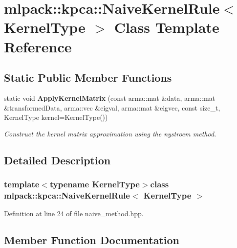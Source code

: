 \section{mlpack\-:\-:kpca\-:\-:Naive\-Kernel\-Rule$<$ Kernel\-Type $>$ Class Template Reference}
\label{classmlpack_1_1kpca_1_1NaiveKernelRule}
\subsection*{Static Public Member Functions}
\begin{DoxyCompactItemize}
\item 
static void {\bf Apply\-Kernel\-Matrix} (const arma\-::mat \&data, arma\-::mat \&transformed\-Data, arma\-::vec \&eigval, arma\-::mat \&eigvec, const size\-\_\-t, Kernel\-Type kernel=Kernel\-Type())
\begin{DoxyCompactList}\small\item\em Construct the kernel matrix approximation using the nystroem method. \end{DoxyCompactList}\end{DoxyCompactItemize}


\subsection{Detailed Description}
\subsubsection*{template$<$typename Kernel\-Type$>$class mlpack\-::kpca\-::\-Naive\-Kernel\-Rule$<$ Kernel\-Type $>$}



Definition at line 24 of file naive\-\_\-method.\-hpp.



\subsection{Member Function Documentation}
